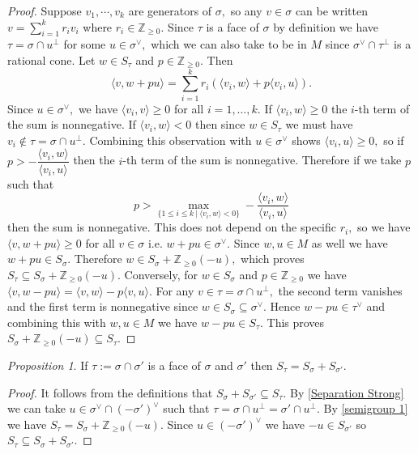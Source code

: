 \documentclass[BSc]{usydthesis}
\numberwithin{equation}{chapter}
\theoremstyle{remark}
\newtheorem{Proposition}[equation]{Proposition}
\newcommand{\Z}{\mathbb{Z}}
\newcommand{\V}{\vee}
\begin{document}
\begin{proof}
Suppose $v_1,\cdots, v_k$ are generators of $\sigma,$ so any $v\in \sigma$ can be written $v=\displaystyle \sum_{i=1}^k  r_i v_i$ where $r_i\in \Z_{\geq 0}.$ Since $\tau$ is a face of $\sigma$ by definition we have $\tau = \sigma \cap u^{\perp}$ for some $u\in \sigma^{\V},$ which we can also take to be in $M$ since $\sigma^{\V} \cap \tau^{\perp}$ is a rational cone. Let $w\in S_{\tau}$ and $p \in \Z_{\geq 0}.$ Then $$ \langle v , w+ pu \rangle = \sum_{i=1}^k r_i \left( \langle v_i , w \rangle + p \langle v_i, u\rangle \right).$$ Since $u\in \sigma^{\V},$ we have $\langle v_i, v \rangle \geq 0$ for all $i=1,\ldots, k.$ If $\langle v_i, w \rangle \geq 0$ the $i$-th term of the sum is nonnegative. If $\langle v_i , w \rangle < 0$ then since $w\in S_{\tau}$ we must have $v_i \notin \tau = \sigma \cap u^{\perp}.$ Combining this observation with $u\in \sigma^{\V}$ shows $\langle v_i, u \rangle \geq 0,$ so if $p > - \dfrac{\langle v_i, w \rangle}{\langle v_i, u\rangle}$ then the $i$-th term of the sum is nonnegative. Therefore if we take $p$ such that $$ p > \max_{ \{ 1\leq i \leq k \ | \ \langle v_i, w \rangle < 0 \} } - \frac{\langle v_i, w \rangle}{\langle v_i, u\rangle} $$ then the sum is nonnegative. This does not depend on the specific $r_i,$ so we have $\langle v , w+pu \rangle \geq 0$ for all $v\in \sigma$ i.e. $w+pu \in \sigma^{\V}.$ Since $w, u \in M$ as well we have $w+pu \in S_{\sigma}.$ Therefore $w\in S_{\sigma} + \Z_{\geq 0} (-u),$ which proves $S_{\tau} \subseteq S_{\sigma} + \Z_{\geq 0} (-u).$ Conversely, for $w\in S_{\sigma}$ and $p\in \Z_{\geq 0}$ we have $\langle v, w-pu\rangle = \langle v, w \rangle - p \langle v, u \rangle.$ For any $v\in \tau = \sigma \cap u^{\perp},$ the second term vanishes and the first term is nonnegative since $w\in S_{\sigma} \subseteq \sigma^{\V}.$ Hence $w-pu \in \tau^{\V}$ and combining this with $w,u \in M$ we have $w-pu \in S_{\tau}.$ This proves $S_{\sigma} + \Z_{\geq 0} (-u) \subseteq S_{\tau}.$

\end{proof}

\begin{Proposition} \label{groupsum} If $\tau:= \sigma \cap \sigma'$ is a face of $\sigma$ and $\sigma'$ then $S_{\tau} = S_{\sigma} + S_{\sigma'}.$
\end{Proposition}

\begin{proof} It follows from the definitions that $S_{\sigma} + S_{\sigma'} \subseteq S_{\tau}.$ By \ref{Separation Strong} we can take $u\in \sigma^{\V} \cap (-\sigma')^{\V}$ such that $\tau = \sigma \cap u^{\perp} = \sigma' \cap u^{\perp}.$ By \ref{semigroup 1} we have $S_{\tau} = S_{\sigma} + \Z_{\geq 0} (-u).$ Since $u\in (-\sigma')^{\V}$ we have $-u \in S_{\sigma'}$ so $S_{\tau} \subseteq S_{\sigma} + S_{\sigma'}.$ 
\end{proof}
\end{document}
